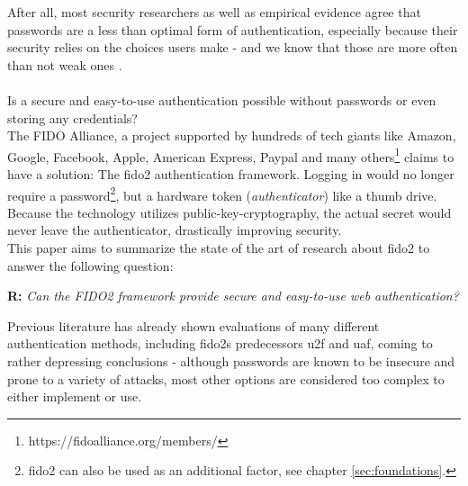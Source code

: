 After all, most security researchers as well as empirical evidence agree that passwords are a less than optimal form of authentication, especially because their security relies on the choices users make - and we know that those are more often than not weak ones \cite{hunt2018c,whitty2015}.\\
\\
Is a secure and easy-to-use authentication possible without passwords or even storing any credentials?\\
The FIDO Alliance, a project supported by hundreds of tech giants like Amazon, Google, Facebook, Apple, American Express, Paypal and many others\footnote{https://fidoalliance.org/members/} claims to have a solution: The \ac{fido2} authentication framework. Logging in would no longer require a password\footnote{\ac{fido2} can also be used as an additional factor, see chapter \ref{sec:foundations}.}, but a hardware token (\emph{authenticator}) like a thumb drive. Because the technology utilizes public-key-cryptography, the actual secret would never leave the authenticator, drastically improving security.\\
This paper aims to summarize the state of the art of research about \ac{fido2} to answer the following question:


\begin{displayquote}
    \textbf{R:} \emph{Can the FIDO2 framework provide secure and easy-to-use web authentication?}
\end{displayquote}

Previous literature has already shown evaluations of many different authentication methods, including \acp{fido2} predecessors \ac{u2f} and \ac{uaf}, coming to rather depressing conclusions \cite{bonneau2012,hunt2018a,lang2017,das2018} - although passwords are known to be insecure and prone to a variety of attacks, most other options are considered too complex to either implement or use.